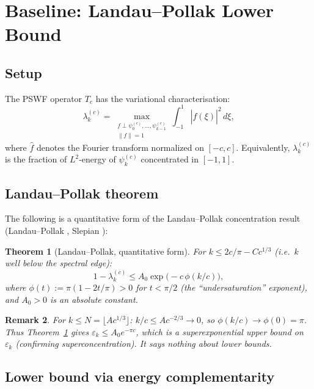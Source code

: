\documentclass[12pt,a4paper]{article}
\newtheorem{theorem}{Theorem}[section]
\newtheorem{remark}[theorem]{Remark}
\newcommand{\lam}[1]{\lambda_{#1}^{(c)}}
\newcommand{\pswf}[1]{\psi_{#1}^{(c)}}
\newcommand{\Tc}{T_c}
\begin{document}
\section{Baseline: Landau--Pollak Lower Bound}
\label{sec:LP}

\subsection{Setup}

The PSWF operator $\Tc$ has the variational characterisation:
\[
  \lam{k} = \max_{\substack{f \perp \pswf{0},\ldots,\pswf{k-1} \\
  \|f\|=1}} \int_{-1}^{1}|\hat f(\xi)|^2\,d\xi,
\]
where $\hat f$ denotes the Fourier transform
normalized on $[-c,c]$.
Equivalently, $\lam{k}$ is the fraction of $L^2$-energy
of $\pswf{k}$ concentrated in $[-1,1]$.

\subsection{Landau--Pollak theorem}

The following is a quantitative form of the
Landau--Pollak concentration result
(Landau--Pollak \cite{LP1961II},
Slepian \cite{Slepian1978}):

\begin{theorem}[Landau--Pollak, quantitative form]
\label{thm:LP}
For $k \leq 2c/\pi - Cc^{1/3}$ (i.e.\ $k$ well below
the spectral edge):
\[
  1 - \lam{k}
  \leq A_0 \exp\!\bigl(-c\,\phi(k/c)\bigr),
\]
where $\phi(t) := \pi(1 - 2t/\pi) > 0$ for
$t < \pi/2$ (the ``undersaturation'' exponent),
and $A_0 > 0$ is an absolute constant.
\end{theorem}

\begin{remark}
For $k \leq N = \lfloor Ac^{1/3}\rfloor$:
$k/c \leq Ac^{-2/3} \to 0$, so
$\phi(k/c) \to \phi(0) = \pi$.
Thus Theorem~\ref{thm:LP} gives
$\varepsilon_k \leq A_0 e^{-\pi c}$,
which is a \emph{superexponential upper} bound on
$\varepsilon_k$ (confirming superconcentration).
It says nothing about lower bounds.
\end{remark}

\subsection{Lower bound via energy complementarity}
\end{document}
